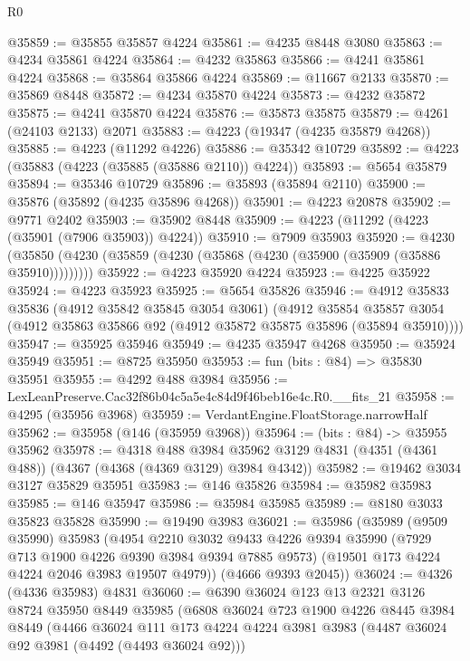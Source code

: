 \begin{lexlean}{R0}
\begin{coremodule}
@35859 := @35855 @35857 @4224
@35861 := @4235 @8448 @3080
@35863 := @4234 @35861 @4224
@35864 := @4232 @35863
@35866 := @4241 @35861 @4224
@35868 := @35864 @35866 @4224
@35869 := @11667 @2133
@35870 := @35869 @8448
@35872 := @4234 @35870 @4224
@35873 := @4232 @35872
@35875 := @4241 @35870 @4224
@35876 := @35873 @35875
@35879 := @4261 (@24103 @2133) @2071
@35883 := @4223 (@19347 (@4235 @35879 @4268))
@35885 := @4223 (@11292 @4226)
@35886 := @35342 @10729
@35892 := @4223 (@35883 (@4223 (@35885 (@35886 @2110)) @4224))
@35893 := @5654 @35879
@35894 := @35346 @10729
@35896 := @35893 (@35894 @2110)
@35900 := @35876 (@35892 (@4235 @35896 @4268))
@35901 := @4223 @20878
@35902 := @9771 @2402
@35903 := @35902 @8448
@35909 := @4223 (@11292 (@4223 (@35901 (@7906 @35903)) @4224))
@35910 := @7909 @35903
@35920 := @4230 (@35850 (@4230 (@35859 (@4230 (@35868 (@4230 (@35900 (@35909 (@35886 @35910)))))))))
@35922 := @4223 @35920 @4224
@35923 := @4225 @35922
@35924 := @4223 @35923
@35925 := @5654 @35826
@35946 := @4912
    @35833
    @35836
    (@4912 @35842 @35845 @3054 @3061)
    (@4912
      @35854
      @35857
      @3054
      (@4912 @35863 @35866 @92 (@4912 @35872 @35875 @35896 (@35894 @35910))))
@35947 := @35925 @35946
@35949 := @4235 @35947 @4268
@35950 := @35924 @35949
@35951 := @8725 @35950
@35953 := fun (bits : @84) => @35830 @35951
@35955 := @4292 @488 @3984
@35956 := LexLeanPreserve.Cac32f86b04c5a5e4c84d9f46beb16e4c.R0.__fits_21
@35958 := @4295 (@35956 @3968)
@35959 := VerdantEngine.FloatStorage.narrowHalf
@35962 := @35958 (@146 (@35959 @3968))
@35964 := (bits : @84) -> @35955 @35962
@35978 := @4318
    @488
    @3984
    @35962
    @3129
    @4831
    (@4351 (@4361 @488))
    (@4367 (@4368 (@4369 @3129) @3984 @4342))
@35982 := @19462 @3034 @3127 @35829 @35951
@35983 := @146 @35826
@35984 := @35982 @35983
@35985 := @146 @35947
@35986 := @35984 @35985
@35989 := @8180 @3033 @35823 @35828
@35990 := @19490 @3983
@36021 := @35986
    (@35989
      (@9509 @35990)
      @35983
      (@4954
        @2210
        @3032
        @9433
        @4226
        @9394
        @35990
        (@7929 @713 @1900 @4226 @9390 @3984 @9394 @7885 @9573)
        (@19501 @173 @4224 @4224 @2046 @3983 @19507 @4979))
      (@4666 @9393 @2045))
@36024 := @4326 (@4336 @35983) @4831
@36060 := @6390
    @36024
    @123
    @13
    @2321
    @3126
    @8724
    @35950
    @8449
    @35985
    (@6808
      @36024
      @723
      @1900
      @4226
      @8445
      @3984
      @8449
      (@4466
        @36024
        @111
        @173
        @4224
        @4224
        @3981
        @3983
        (@4487 @36024 @92 @3981 (@4492 (@4493 @36024 @92)))

\end{coremodule}
\end{lexlean}
